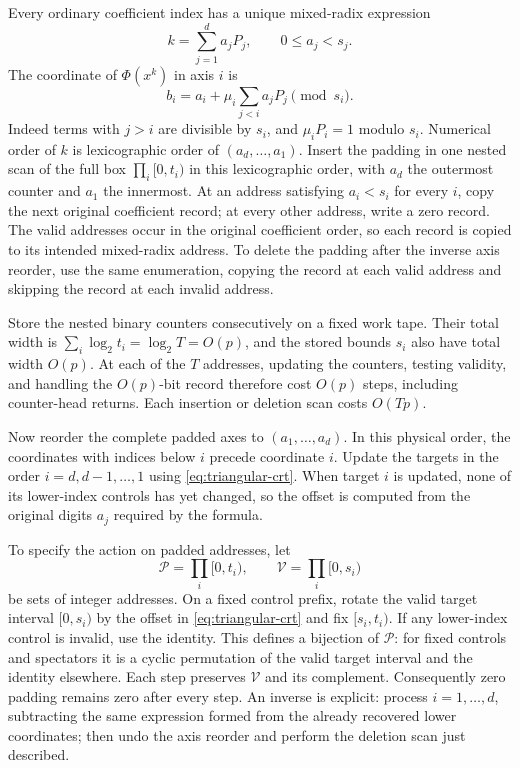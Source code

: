 Every ordinary coefficient index has a unique mixed-radix expression
\[
 k=\sum_{j=1}^d a_jP_j,\qquad 0\le a_j<s_j.
\]
The coordinate of $\Phi(x^k)$ in axis $i$ is
\begin{equation}\label{eq:triangular-crt}
 b_i=a_i+\mu_i\sum_{j<i}a_jP_j\pmod{s_i}.
\end{equation}
Indeed terms with $j>i$ are divisible by $s_i$, and $\mu_iP_i=1$ modulo
$s_i$.  Numerical order of $k$ is lexicographic order of
$(a_d,\ldots,a_1)$.  Insert the padding in one nested scan of the full
box $\prod_i[0,t_i)$ in this lexicographic order, with $a_d$ the
outermost counter and $a_1$ the innermost.  At an address satisfying
$a_i<s_i$ for every $i$, copy the next original coefficient record;
at every other address, write a zero record.  The valid addresses
occur in the original coefficient order, so each record is copied to
its intended mixed-radix address.  To delete the padding after the
inverse axis reorder, use the same enumeration, copying the record at
each valid address and skipping the record at each invalid address.

Store the nested binary counters consecutively on a fixed work tape.
Their total width is $\sum_i\log_2t_i=\log_2T=O(p)$, and the stored
bounds $s_i$ also have total width $O(p)$.  At each of the $T$
addresses, updating the counters, testing validity, and handling the
$O(p)$-bit record therefore cost $O(p)$ steps, including counter-head
returns.  Each insertion or deletion scan costs $O(Tp)$.

Now reorder the complete padded axes to $(a_1,\ldots,a_d)$.  In this
physical order, the coordinates with
indices below $i$ precede coordinate $i$.  Update the targets in the
order $i=d,d-1,\ldots,1$ using \eqref{eq:triangular-crt}.  When target
$i$ is updated, none of its lower-index controls has yet changed, so
the offset is computed from the original digits $a_j$ required by the
formula.

To specify the action on padded addresses, let
\[
 \mathcal P=\prod_i[0,t_i),\qquad \mathcal V=\prod_i[0,s_i)
\]
be sets of integer addresses.  On a fixed control prefix, rotate the
valid target interval $[0,s_i)$ by the offset in
\eqref{eq:triangular-crt} and fix $[s_i,t_i)$.  If any lower-index
control is invalid, use the identity.  This defines a bijection of
$\mathcal P$: for fixed controls and spectators it is a cyclic
permutation of the valid target interval and the identity elsewhere.
Each step preserves $\mathcal V$ and its complement.  Consequently
zero padding remains zero after every step.  An inverse is explicit:
process $i=1,\ldots,d$, subtracting the same expression formed from the
already recovered lower coordinates; then undo the axis reorder and
perform the deletion scan just described.


